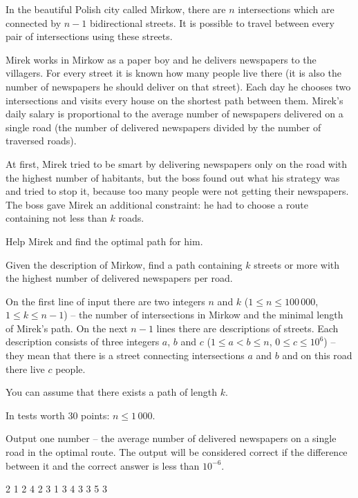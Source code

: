 





In the beautiful Polish city called Mirkow, there are $n$ intersections which are connected by $n - 1$ bidirectional streets.
It is possible to travel between every pair of intersections using these streets.

Mirek works in Mirkow as a paper boy and he delivers newspapers to the villagers.
For every street it is known how many people live there
	(it is also the number of newspapers he should deliver on that street).
Each day he chooses two intersections and visits every house on the shortest path between them.
Mirek's daily salary is proportional to the average number of newspapers delivered on a single road
	(the number of delivered newspapers divided by the number of traversed roads).

At first, Mirek tried to be smart by delivering newspapers only on the road with the highest number of habitants,
	but the boss found out what his strategy was and tried to stop it, because too many people were not getting their newspapers.
The boss gave Mirek an additional constraint: he had to choose a route containing not less than $k$ roads.

Help Mirek and find the optimal path for him.


Given the description of Mirkow, find a path containing $k$ streets or more
	with the highest number of delivered newspapers per road.


On the first line of input there are two integers $n$ and $k$ ($1 \le n \le 100\,000$, $1 \le k \le n - 1$)
	-- the number of intersections in Mirkow and the minimal length of Mirek's path.
On the next $n-1$ lines there are descriptions of streets.
Each description consists of three integers $a$, $b$ and $c$ ($1 \le a < b \le n$, $0 \le c \le 10^6$)
	-- they mean that there is a street connecting intersections $a$ and $b$ and on this road there live $c$ people.

You can assume that there exists a path of length $k$.

In tests worth $30$ points: $n \le 1\,000$.


Output one number -- the average number of delivered newspapers on a single road in the optimal route.
The output will be considered correct if the difference between it and the correct answer is less than $10^{-6}$.


 2
1 2 4
2 3 1
3 4 3
3 5 3
\sampleEND


